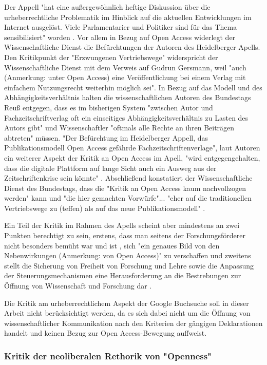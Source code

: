 Der Appell "hat eine außergewöhnlich heftige Diskussion über die urheberrechtliche Problematik im Hinblick auf die aktuellen Entwicklungen im Internet ausgelöst. Viele Parlamentarier und Politiker sind für das Thema sensibilisiert" worden \cite{WD_bundestag_2009}. Vor allem in Bezug auf Open Access widerlegt der Wissenschaftliche Dienst die Befürchtungen der Autoren des Heidelberger Apells. Den Kritikpunkt der "Erzwungenen Vertriebswege" widerspricht der Wissenschaftliche Dienst mit dem Verweis auf Gudrun Gersmann, weil "auch (Anmerkung: unter Open Access) eine Veröffentlichung bei einem Verlag mit einfachem Nutzungsrecht weiterhin möglich sei". In Bezug auf das Modell und des Abhängigkeitsverhältnis halten die wissenschaftlichen Autoren des Bundestags Reuß entgegen, dass es im bisherigen System "zwischen Autor und Fachzeitschriftverlag oft ein einseitiges Abhängigkeitsverhältnis zu Lasten des Autors gibt" und Wissenschaftler "oftmals alle Rechte an ihren Beiträgen abtreten" \cite{WD_bundestag_2009} müssen. "Der Befürchtung im Heidelberger Appell, das Publikationsmodell Open Access gefährde Fachzeitschriftenverlage", laut Autoren ein weiterer Aspekt der Kritik an Open Access im Apell, "wird entgegengehalten, dass die digitale Plattform auf lange Sicht auch ein Ausweg aus der Zeitschriftenkrise sein könnte" \cite{WD_bundestag_2009}. Abschließend konstatiert der Wissenschaftliche Dienst des Bundestags, dass die "Kritik an Open Access kaum nachvollzogen werden" kann und "die hier gemachten Vorwürfe"... "eher auf die traditionellen Vertriebswege zu (teffen) als auf das neue Publikationsmodell" \cite{WD_bundestag_2009}.

Ein Teil der Kritik im Rahmen des Apells scheint aber mindestens an zwei Punkten berechtigt zu sein, erstens, dass man seitens der Forschungsförderer nicht besonders bemüht war und ist \cite{suchen}, sich "ein genaues Bild von den Nebenwirkungen (Anmerkung: von Open Access)" \cite{Reuss_2009} zu verschaffen und zweitens stellt die Sicherung von Freiheit von Forschung und Lehre sowie die Anpassung der Steuerungsmechanismen eine Herausforderung an die Bestrebungen zur Öffnung von Wissenschaft und Forschung dar \cite{suchen}.

Die Kritik am urheberrechtlichem Aspekt der Google Buchsuche soll in dieser Arbeit nicht berücksichtigt werden, da es sich dabei nicht um die Öffnung von wissenschaftlicher Kommunikation nach den Kriterien der gängigen Deklarationen handelt und keinen Bezug zur Open Access-Bewegung auffweist. 

\subsubsection{Kritik der neoliberalen Rethorik von "Openness"}

